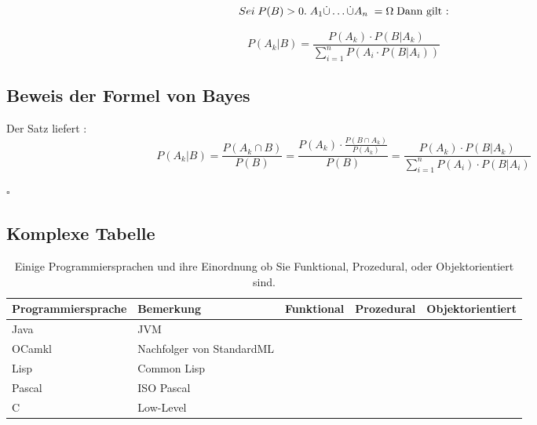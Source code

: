 \documentclass[paper=a4,fontsize=12pt,ngerman]{scrartcl}
\newcommand{\cmark}{\ding{51}}
\newcommand{\xmark}{\ding{55}}
\begin{document}
\[
Sei \; P(B)>0. \; A_1 \dot{\cup} \ldots \dot{\cup} A_n \;  =\Omega \; \text{Dann gilt :} \newline
\]

\[
P(A_k | B) = \frac{P(A_k)  \cdot P(B | A_k)}{\sum_{i=1}^{n}P(A_i  \cdot P(B | A_i))}
\]

\subsection{Beweis der Formel von Bayes}

Der Satz liefert : 
\[ 
P(A_k | B) = \frac{P(A_k \cap B)}{P(B)} = \frac{P(A_k) \cdot \frac{P(B \cap A_k)}{P(A_k)}} {P(B)} = \frac{P(A_k) \cdot P(B | A_k)}{ \sum_{i=1}^{n}P(A_i) \cdot P(B | A_i)}
\]

$\square$

\subsection{Komplexe Tabelle}

\begin{table}[ht]
    \centering

    \begin{adjustbox}{max width=0.8\textwidth}


        \begin{tabular}{@{} l l c c c @{}}
        \toprule

        \textbf{Programmiersprache} & \textbf{Bemerkung} & \textbf{Funktional} & \textbf{Prozedural} & \textbf{Objektorientiert} \\
        \midrule
            
            Java & JVM & \xmark & \xmark & \cmark   \\
            OCamkl & Nachfolger von StandardML & \cmark & \xmark & \xmark \\
            Lisp & Common Lisp & \cmark & \xmark & \xmark \\
            Pascal & ISO Pascal & \xmark & \cmark & \xmark \\ 
            C & Low-Level & \xmark & \cmark & \xmark \\

        \bottomrule

            
        \end{tabular}
    
    \end{adjustbox}

    \caption{Einige Programmiersprachen und ihre Einordnung ob Sie Funktional, Prozedural,
     oder Objektorientiert sind.}
    \label{tab:compar}
    
\end{table}
\end{document}
